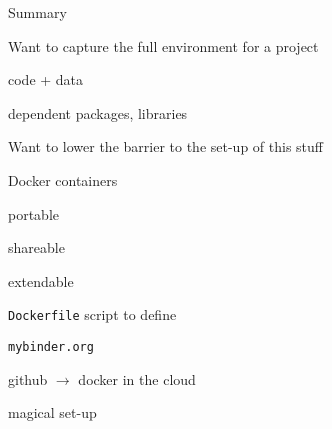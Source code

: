 \documentclass[aspectratio=169,12pt,t]{beamer}
\begin{document}
\begin{frame}{Summary}

\vspace{-3mm}

  \bbi
\item Want to capture the full environment for a project
  \bi
\item code + data
\item dependent packages, libraries
  \ei
\item Want to lower the barrier to the set-up of this stuff
\item Docker containers
  \bi
\item portable
\item shareable
\item extendable
\item {\tt Dockerfile} script to define
  \ei
\item {\tt mybinder.org}
  \bi
\item github $\rightarrow$ docker in the cloud
\item magical set-up
  \ei
  \ei

\end{frame}
\end{document}
